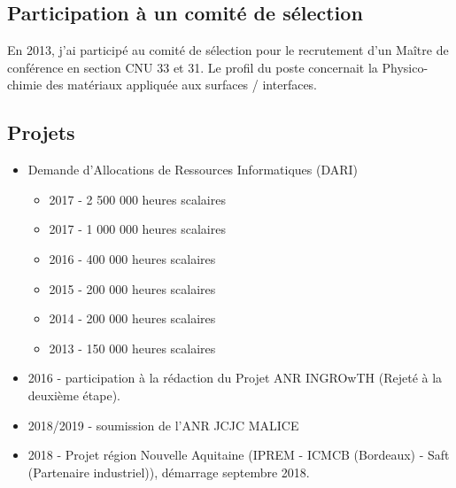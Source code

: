 \documentclass[11pt]{artuppax}
\newcounter{subsec}[section]
\begin{document}
\subsection{Participation à un comité de sélection}

En 2013, j'ai participé au comité de sélection pour le recrutement d'un Maître de
conférence en section CNU 33 et 31. Le profil du poste concernait la
Physico-chimie des matériaux appliquée aux surfaces / interfaces.

\subsection{Projets}

\begin{itemize}
    \item Demande d'Allocations de Ressources Informatiques (DARI)
    \begin{itemize}
        \item 2017 - 2 500 000 heures scalaires
        \item 2017 - 1 000 000 heures scalaires
        \item 2016 - 400 000 heures scalaires
        \item 2015 - 200 000 heures scalaires
        \item 2014 - 200 000 heures scalaires
        \item 2013 - 150 000 heures scalaires
    \end{itemize}
    \item 2016 - participation à la rédaction du Projet ANR INGROwTH (Rejeté à la deuxième étape).
    \item 2018/2019 - soumission de l'ANR JCJC MALICE
    \item 2018 - Projet région Nouvelle Aquitaine (IPREM - ICMCB (Bordeaux) - Saft (Partenaire industriel)), démarrage septembre 2018.
\end{itemize}
\end{document}
